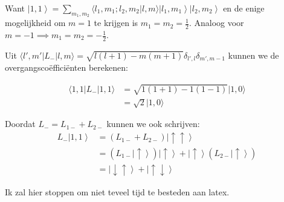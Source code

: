 Want \(\left| 1, 1 \right\rangle = \sum_{m_1, m_2} \langle l_1, m_1; l_2, m_2 | l, m \rangle \left| l_1, m_1 \right\rangle \left| l_2, m_2 \right\rangle\) en de enige mogelijkheid om \(m=1\) te krijgen is \(m_1 = m_2 = \frac{1}{2}\).
Analoog voor \(m=-1 \implies m_1 = m_2 = -\frac{1}{2}\).


Uit \(\langle l',m' | L_{-} | l, m \rangle = \sqrt{l(l+1) - m(m+1)} \delta_{l',l} \delta_{m',m-1}\) kunnen we de overgangscoëfficiënten berekenen:


\begin{align*}
    \langle 1, 1 | L_{-} | 1,1 \rangle &= \sqrt{1(1+1)-1(1-1)}|1,0\rangle \\
    &=  \sqrt{2} |1,0\rangle 
\end{align*}

Doordat \(L_{-} = L_{1-} + L_{2-}\) kunnen we ook schrijven:
\begin{align*}
    L_{-} \left| 1,1 \right\rangle &= (L_{1-} + L_{2-}) \left| \uparrow \uparrow \right\rangle \\
    &= (L_{1-} \left| \uparrow \right\rangle)\left| \uparrow \right\rangle + \left|\uparrow \right\rangle (L_{2-} \left| \uparrow \right\rangle) \\
    &= \left| \downarrow\uparrow \right\rangle +  \left|\uparrow \downarrow \right\rangle 
\end{align*}    

Ik zal hier stoppen om niet teveel tijd te besteden aan latex.